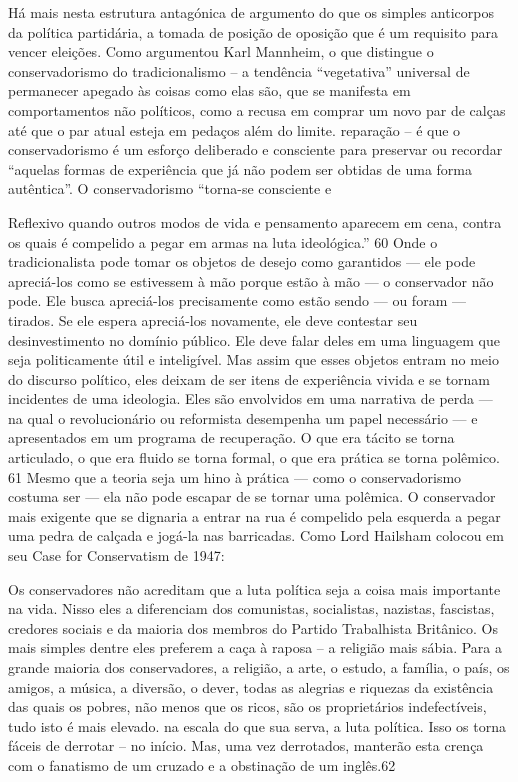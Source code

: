  \par 
Há mais nesta estrutura antagónica de argumento do que os simples anticorpos da política partidária, a tomada de posição de oposição que é um requisito para vencer eleições. Como argumentou Karl Mannheim, o que distingue o conservadorismo do tradicionalismo – a tendência “vegetativa” universal de permanecer apegado às coisas como elas são, que se manifesta em comportamentos não políticos, como a recusa em comprar um novo par de calças até que o par atual esteja em pedaços além do limite. reparação – é que o conservadorismo é um esforço deliberado e consciente para preservar ou recordar “aquelas formas de experiência que já não podem ser obtidas de uma forma autêntica”. O conservadorismo “torna-se consciente e
 \par 
Reflexivo quando outros modos de vida e pensamento aparecem em cena, contra os quais é compelido a pegar em armas na luta ideológica.” {\color{blue}60} Onde o tradicionalista pode tomar os objetos de desejo como garantidos — ele pode apreciá-los como se estivessem à mão porque estão à mão — o conservador não pode. Ele busca apreciá-los precisamente como estão sendo — ou foram — tirados. Se ele espera apreciá-los novamente, ele deve contestar seu desinvestimento no domínio público. Ele deve falar deles em uma linguagem que seja politicamente útil e inteligível. Mas assim que esses objetos entram no meio do discurso político, eles deixam de ser itens de experiência vivida e se tornam incidentes de uma ideologia. Eles são envolvidos em uma narrativa de perda — na qual o revolucionário ou reformista desempenha um papel necessário — e apresentados em um programa de recuperação. O que era tácito se torna articulado, o que era fluido se torna formal, o que era prática se torna polêmico. {\color{blue}61} Mesmo que a teoria seja um hino à prática — como o conservadorismo costuma ser — ela não pode escapar de se tornar uma polêmica. O conservador mais exigente que se dignaria a entrar na rua é compelido pela esquerda a pegar uma pedra de calçada e jogá-la nas barricadas. Como Lord Hailsham colocou em seu Case for Conservatism de 1947:
 \par 
Os conservadores não acreditam que a luta política seja a coisa mais importante na vida. Nisso eles a diferenciam dos comunistas, socialistas, nazistas, fascistas, credores sociais e da maioria dos membros do Partido Trabalhista Britânico. Os mais simples dentre eles preferem a caça à raposa – a religião mais sábia. Para a grande maioria dos conservadores, a religião, a arte, o estudo, a família, o país, os amigos, a música, a diversão, o dever, todas as alegrias e riquezas da existência das quais os pobres, não menos que os ricos, são os proprietários indefectíveis, tudo isto é mais elevado. na escala do que sua serva, a luta política. Isso os torna fáceis de derrotar – no início. Mas, uma vez derrotados, manterão esta crença com o fanatismo de um cruzado e a obstinação de um inglês.{\color{blue}62}

